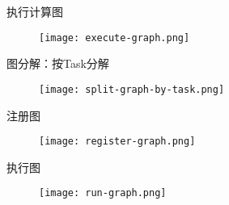 \begin{frame}{执行计算图}
  \begin{figure}
    \centering
    \texttt{[image: execute-graph.png]}
  \end{figure}
\end{frame}

\begin{frame}{图分解：按Task分解}
  \begin{figure}
    \centering
    \texttt{[image: split-graph-by-task.png]}
  \end{figure}
\end{frame}

\begin{frame}{注册图}
  \begin{figure}
    \centering
    \texttt{[image: register-graph.png]}
  \end{figure}
\end{frame}

\begin{frame}{执行图}
  \begin{figure}
    \centering
    \texttt{[image: run-graph.png]}
  \end{figure}
\end{frame}

